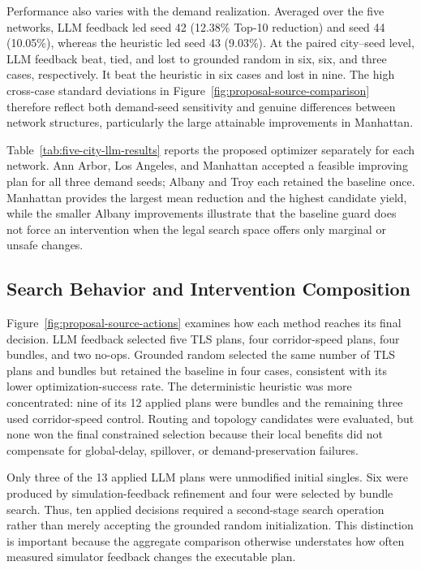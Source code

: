 Performance also varies with the demand realization.  Averaged over the five
networks, LLM feedback led seed 42 (12.38\% Top-10 reduction) and seed 44
(10.05\%), whereas the heuristic led seed 43 (9.03\%).  At the paired
city--seed level, LLM feedback beat, tied, and lost to grounded random in six,
six, and three cases, respectively.  It beat the heuristic in six cases and
lost in nine.  The high cross-case standard deviations in
Figure~\ref{fig:proposal-source-comparison} therefore reflect both demand-seed
sensitivity and genuine differences between network structures, particularly
the large attainable improvements in Manhattan.

Table~\ref{tab:five-city-llm-results} reports the proposed optimizer separately
for each network.  Ann Arbor, Los Angeles, and Manhattan accepted a feasible
improving plan for all three demand seeds; Albany and Troy each retained the
baseline once.  Manhattan provides the largest mean reduction and the highest
candidate yield, while the smaller Albany improvements illustrate that the
baseline guard does not force an intervention when the legal search space
offers only marginal or unsafe changes.


\subsection{Search Behavior and Intervention Composition}
\label{sec:search-behavior}

Figure~\ref{fig:proposal-source-actions} examines how each method reaches its
final decision.  LLM feedback selected five TLS plans, four corridor-speed
plans, four bundles, and two no-ops.  Grounded random selected the same number
of TLS plans and bundles but retained the baseline in four cases, consistent
with its lower optimization-success rate.  The deterministic heuristic was
more concentrated: nine of its 12 applied plans were bundles and the remaining
three used corridor-speed control.  Routing and topology candidates were
evaluated, but none won the final constrained selection because their local
benefits did not compensate for global-delay, spillover, or demand-preservation
failures.

Only three of the 13 applied LLM plans were unmodified initial singles.  Six
were produced by simulation-feedback refinement and four were selected by
bundle search.  Thus, ten applied decisions required a second-stage search
operation rather than merely accepting the grounded random initialization.
This distinction is important because the aggregate comparison otherwise
understates how often measured simulator feedback changes the executable plan.


